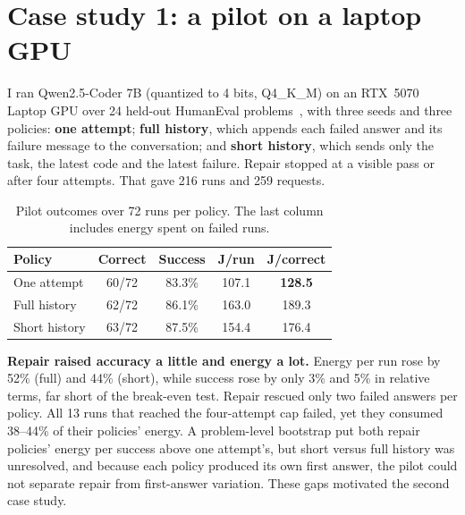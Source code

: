 \documentclass[11pt,a4paper]{article}
\begin{document}
\section{Case study 1: a pilot on a laptop GPU}
I ran Qwen2.5-Coder 7B (quantized to 4 bits, Q4\_K\_M) on an RTX~5070 Laptop GPU over 24 held-out HumanEval problems~\cite{chen2021humaneval}, with three seeds and three policies: \textbf{one attempt}; \textbf{full history}, which appends each failed answer and its failure message to the conversation; and \textbf{short history}, which sends only the task, the latest code and the latest failure. Repair stopped at a visible pass or after four attempts. That gave 216 runs and 259 requests.

\begin{table}[H]
\centering\small
\caption[Pilot: outcomes over 72 runs per policy]{Pilot outcomes over 72 runs per policy. The last column includes energy spent on failed runs.}
\label{tab:main}
\begin{tabular}{@{}lcccc@{}}
\toprule
Policy & Correct & Success & J/run & J/correct\\\midrule
One attempt & 60/72 & 83.3\% & 107.1 & \textbf{128.5}\\
Full history & 62/72 & 86.1\% & 163.0 & 189.3\\
Short history & 63/72 & 87.5\% & 154.4 & 176.4\\\bottomrule
\end{tabular}
\end{table}

\textbf{Repair raised accuracy a little and energy a lot.} Energy per run rose by 52\% (full) and 44\% (short), while success rose by only 3\% and 5\% in relative terms, far short of the break-even test. Repair rescued only two failed answers per policy. All 13 runs that reached the four-attempt cap failed, yet they consumed 38--44\% of their policies' energy. A problem-level bootstrap put both repair policies' energy per success above one attempt's, but short versus full history was unresolved, and because each policy produced its own first answer, the pilot could not separate repair from first-answer variation. These gaps motivated the second case study.

\end{document}
